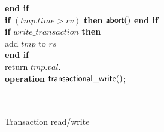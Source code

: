 \documentclass[11pt]{article}
\begin{document}
\begin{figure}[htb]
{{\begin{minipage}[t]{150mm}
\begin{tabbing}
 \> {\bf end if} \\

 \> {\bf if} $(tmp.time > rv)$ {\bf then} ${\sf abort}()$ {\bf end if} \\
 \> {\bf if} $write\_transaction$ {\bf then} \\
 \>\> add $tmp$ to $rs$ \\
 \> {\bf end if} \\
 \> {\sf return} $tmp.val$. \\


{\bf operation}  ${\sf transactional\_write}()$;\\
 \> \\
 \> \\




\end{tabbing}
\normalsize
\end{minipage}
}
\caption{Transaction read/write}
\label{fig-prevent-looping}
}
\end{figure}
\end{document}

